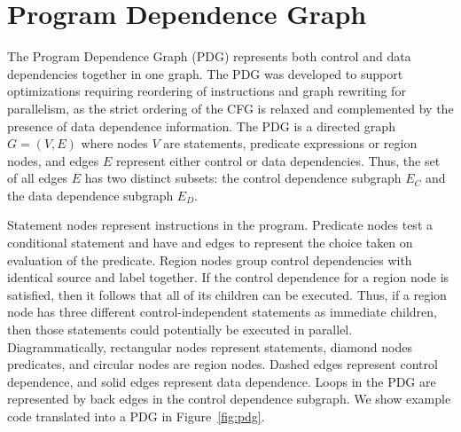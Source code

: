\section{Program Dependence Graph}
\label{section:vsdg:pdg}
The Program Dependence Graph (PDG) represents both control and data dependencies together in one graph. 
The PDG was developed to support optimizations requiring reordering of instructions and graph rewriting for parallelism, as the strict ordering of the CFG is relaxed and complemented by the presence of data dependence information. 
The PDG is a directed graph $G=(V,E)$ where nodes $V$ are statements, predicate expressions or region nodes, and edges $E$ represent either control or data dependencies. 
Thus, the set of all edges $E$ has two distinct subsets: 
the control dependence subgraph $E_{C}$ and the data dependence subgraph $E_{D}$.

Statement nodes represent instructions in the program. 
Predicate nodes test a conditional statement and have \true and \false edges to represent the choice taken on evaluation of the predicate. 
Region nodes group control dependencies with identical source and label together. 
If the control dependence for a region node is satisfied, then it follows that all of its children can be executed. 
Thus, if a region node has three different control-independent statements as immediate children, then those statements could potentially be executed in parallel. 
Diagrammatically, rectangular nodes represent statements, diamond nodes predicates, and circular nodes are region nodes. 
Dashed edges represent control dependence, and solid edges represent data dependence. 
Loops in the PDG are represented by back edges in the control dependence subgraph. 
We show example code translated into a PDG in Figure~\ref{fig:pdg}.


